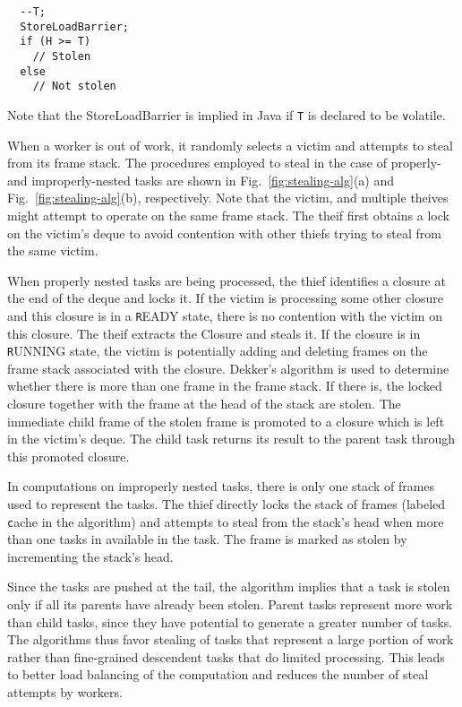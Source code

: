 \begin{verbatim}
  --T; 
  StoreLoadBarrier;
  if (H >= T) 
    // Stolen 
  else 
    // Not stolen
\end{verbatim}

Note that the StoreLoadBarrier is implied in Java if {\texttt T} is
declared to be {\texttt volatile}.

When a worker is out of work, it randomly selects a victim and
attempts to steal from its frame stack. The procedures employed to
steal in the case of properly- and improperly-nested tasks are shown
in Fig.~\ref{fig:stealing-alg}(a) and Fig.~\ref{fig:stealing-alg}(b),
respectively. Note that the victim, and multiple theives might attempt
to operate on the same frame stack. The theif first obtains a lock on
the victim's deque to avoid contention with other thiefs trying to
steal from the same victim.

When properly nested tasks are being processed, the thief identifies a
closure at the end of the deque and locks it. If the victim is
processing some other closure and this closure is in a {\texttt READY}
state, there is no contention with the victim on this closure. The
theif extracts the Closure and steals it. If the closure is in
{\texttt RUNNING} state, the victim is potentially adding and deleting
frames on the frame stack associated with the closure. Dekker's
algorithm is used to determine whether there is more than one frame in
the frame stack. If there is, the locked closure together with the
frame at the head of the stack are stolen. The immediate child frame
of the stolen frame is promoted to a closure which is left in the
victim's deque. The child task returns its result to the parent task
through this promoted closure.

In computations on improperly nested tasks, there is only one stack of
frames used to represent the tasks. The thief directly locks the stack
of frames (labeled {\texttt cache} in the algorithm) and attempts to
steal from the stack's head when more than one tasks in available in
the task. The frame is marked as stolen by incrementing the stack's
head. 

Since the tasks are pushed at the tail, the algorithm implies that a
task is stolen only if all its parents have already been
stolen. Parent tasks represent more work than child tasks, since they
have potential to generate a greater number of tasks. The algorithms
thus favor stealing of tasks that represent a large portion of work
rather than fine-grained descendent tasks that do limited
processing. This leads to better load balancing of the computation and
reduces the number of steal attempts by workers.



